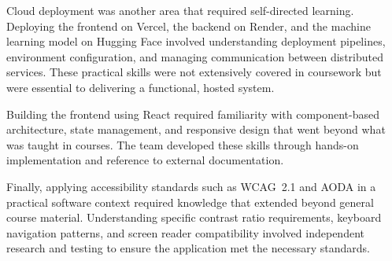 \documentclass{article}
\begin{document}
Cloud deployment was another area that required self-directed learning. Deploying 
the frontend on Vercel, the backend on Render, and the machine learning model on 
Hugging Face involved understanding deployment pipelines, environment configuration, 
and managing communication between distributed services. These practical skills were 
not extensively covered in coursework but were essential to delivering a functional, 
hosted system.

Building the frontend using React required familiarity with component-based 
architecture, state management, and responsive design that went beyond what was 
taught in courses. The team developed these skills through hands-on implementation 
and reference to external documentation.

Finally, applying accessibility standards such as WCAG~2.1 and AODA in a practical 
software context required knowledge that extended beyond general course material. 
Understanding specific contrast ratio requirements, keyboard navigation patterns, 
and screen reader compatibility involved independent research and testing to ensure 
the application met the necessary standards.
\end{document}
